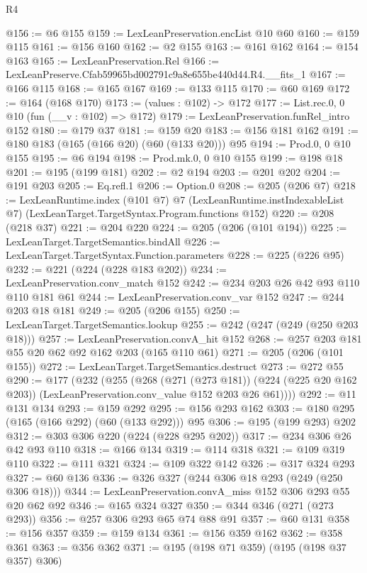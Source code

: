 \begin{lexlean}{R4}
\begin{coremodule}
@156 := @6 @155
@159 := LexLeanPreservation.encList @10 @60
@160 := @159 @115
@161 := @156 @160
@162 := @2 @155
@163 := @161 @162
@164 := @154 @163
@165 := LexLeanPreservation.Rel
@166 := LexLeanPreserve.Cfab59965bd002791c9a8e655be440d44.R4.__fits_1
@167 := @166 @115
@168 := @165 @167
@169 := @133 @115
@170 := @60 @169
@172 := @164 (@168 @170)
@173 := (values : @102) -> @172
@177 := List.rec.{0, 0} @10 (fun (__v : @102) => @172)
@179 := LexLeanPreservation.funRel_intro @152
@180 := @179 @37
@181 := @159 @20
@183 := @156 @181 @162
@191 := @180 @183 (@165 (@166 @20) (@60 (@133 @20))) @95
@194 := Prod.{0, 0} @10 @155
@195 := @6 @194
@198 := Prod.mk.{0, 0} @10 @155
@199 := @198 @18
@201 := @195 (@199 @181)
@202 := @2 @194
@203 := @201 @202
@204 := @191 @203
@205 := Eq.refl.{1}
@206 := Option.{0}
@208 := @205 (@206 @7)
@218 := LexLeanRuntime.index
    (@101 @7)
    @7
    (LexLeanRuntime.instIndexableList @7)
    (LexLeanTarget.TargetSyntax.Program.functions @152)
@220 := @208 (@218 @37)
@221 := @204 @220
@224 := @205 (@206 (@101 @194))
@225 := LexLeanTarget.TargetSemantics.bindAll
@226 := LexLeanTarget.TargetSyntax.Function.parameters
@228 := @225 (@226 @95)
@232 := @221 (@224 (@228 @183 @202))
@234 := LexLeanPreservation.conv_match @152
@242 := @234 @203 @26 @42 @93 @110 @110 @181 @61
@244 := LexLeanPreservation.conv_var @152
@247 := @244 @203 @18 @181
@249 := @205 (@206 @155)
@250 := LexLeanTarget.TargetSemantics.lookup
@255 := @242 (@247 (@249 (@250 @203 @18)))
@257 := LexLeanPreservation.convA_hit @152
@268 := @257 @203 @181 @55 @20 @62 @92 @162 @203 (@165 @110 @61)
@271 := @205 (@206 (@101 @155))
@272 := LexLeanTarget.TargetSemantics.destruct
@273 := @272 @55
@290 := @177
    (@232
      (@255
        (@268
          (@271 (@273 @181))
          (@224 (@225 @20 @162 @203))
          (LexLeanPreservation.conv_value @152 @203 @26 @61))))
@292 := @11 @131 @134
@293 := @159 @292
@295 := @156 @293 @162
@303 := @180 @295 (@165 (@166 @292) (@60 (@133 @292))) @95
@306 := @195 (@199 @293) @202
@312 := @303 @306 @220 (@224 (@228 @295 @202))
@317 := @234 @306 @26 @42 @93 @110
@318 := @166 @134
@319 := @114 @318
@321 := @109 @319 @110
@322 := @111 @321
@324 := @109 @322 @142
@326 := @317 @324 @293
@327 := @60 @136
@336 := @326 @327 (@244 @306 @18 @293 (@249 (@250 @306 @18)))
@344 := LexLeanPreservation.convA_miss @152 @306 @293 @55 @20 @62 @92
@346 := @165 @324 @327
@350 := @344 @346 (@271 (@273 @293))
@356 := @257 @306 @293 @65 @74 @88 @91
@357 := @60 @131
@358 := @156 @357
@359 := @159 @134
@361 := @156 @359 @162
@362 := @358 @361
@363 := @356 @362
@371 := @195 (@198 @71 @359) (@195 (@198 @37 @357) @306)

\end{coremodule}
\end{lexlean}
